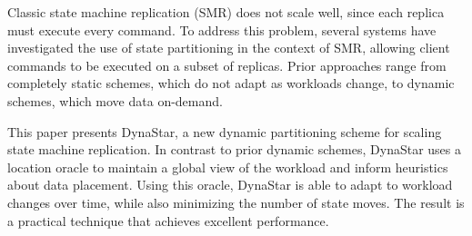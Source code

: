 
Classic state machine replication (SMR) does not scale well, since
each replica must execute every command.  To address this problem,
several systems have investigated the use of state partitioning in the
context of SMR, allowing client commands to be executed on a subset of
replicas. Prior approaches range from completely static schemes, which do not
adapt as workloads change, to dynamic schemes, which move data on-demand.


This paper presents DynaStar, a new dynamic partitioning scheme for
scaling state machine replication. In contrast to prior dynamic
schemes, DynaStar uses a location oracle to maintain a global view
of the workload and inform heuristics about data placement. Using this
oracle, DynaStar is able to adapt to workload changes over time,
while also minimizing the number of state moves. The result is a
practical technique that achieves excellent performance.


